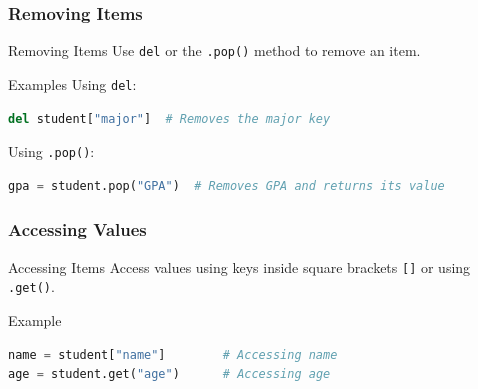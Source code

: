 \documentclass{beamer}
\begin{document}
\begin{frame}[fragile]
    \frametitle{Removing Items}
    \begin{block}{Removing Items}
        Use \texttt{del} or the \texttt{.pop()} method to remove an item.
    \end{block}
    
    \begin{block}{Examples}
        Using \texttt{del}:
        \begin{lstlisting}[language=Python]
del student["major"]  # Removes the major key
        \end{lstlisting}
        
        Using \texttt{.pop()}:
        \begin{lstlisting}[language=Python]
gpa = student.pop("GPA")  # Removes GPA and returns its value
        \end{lstlisting}
    \end{block}
\end{frame}

\begin{frame}[fragile]
    \frametitle{Accessing Values}
    \begin{block}{Accessing Items}
        Access values using keys inside square brackets \texttt{[]} or using \texttt{.get()}.
    \end{block}
    
    \begin{block}{Example}
    \begin{lstlisting}[language=Python]
name = student["name"]        # Accessing name
age = student.get("age")      # Accessing age
    \end{lstlisting}
    \end{block}
\end{frame}
\end{document}
